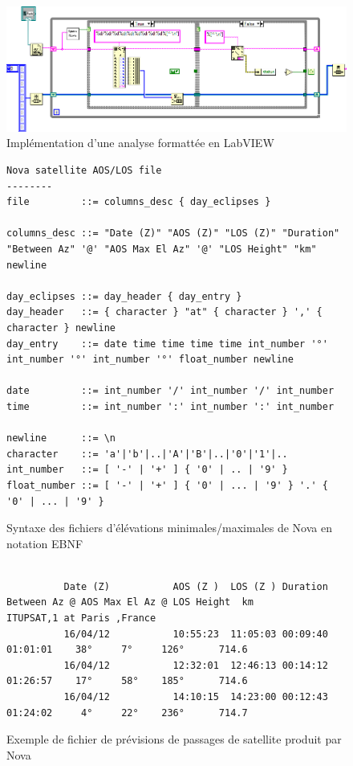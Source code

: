 \documentclass[twocolumn,pre,floats,aps,amsmath,amssymb]{revtex4}
\begin{document}
\begin{figure}[]
  \includegraphics[width=17cm]{pictures/parser_nova_labview.png}
\caption{Impl\'ementation d'une analyse formatt\'ee en LabVIEW}
\label{fig:algo_scan_parse_nova_labview}
\end{figure}

\begin{figure}
\begin{verbatim}
Nova satellite AOS/LOS file
--------
file         ::= columns_desc { day_eclipses }

columns_desc ::= "Date (Z)" "AOS (Z)" "LOS (Z)" "Duration" "Between Az" '@' "AOS Max El Az" '@' "LOS Height" "km" newline

day_eclipses ::= day_header { day_entry }
day_header   ::= { character } "at" { character } ',' { character } newline
day_entry    ::= date time time time time int_number '°' int_number '°' int_number '°' float_number newline

date         ::= int_number '/' int_number '/' int_number
time         ::= int_number ':' int_number ':' int_number

newline      ::= \n
character    ::= 'a'|'b'|..|'A'|'B'|..|'0'|'1'|..
int_number   ::= [ '-' | '+' ] { '0' | .. | '9' }
float_number ::= [ '-' | '+' ] { '0' | ... | '9' } '.' { '0' | ... | '9' }
\end{verbatim}
\caption{Syntaxe des fichiers d'\'el\'evations minimales/maximales de Nova en notation EBNF}
\label{fig:EBNF_Nova}
\end{figure}

\begin{figure}
{\scriptsize
\begin{verbatim}

          Date (Z)           AOS (Z )  LOS (Z ) Duration  Between Az @ AOS Max El Az @ LOS Height  km 
ITUPSAT,1 at Paris ,France                                                                            
          16/04/12           10:55:23  11:05:03 00:09:40 01:01:01    38°     7°     126°      714.6   
          16/04/12           12:32:01  12:46:13 00:14:12 01:26:57    17°     58°    185°      714.6   
          16/04/12           14:10:15  14:23:00 00:12:43 01:24:02     4°     22°    236°      714.7   

\end{verbatim}
}
\caption{Exemple de fichier de pr\'evisions de passages de satellite produit par Nova}
\label{fig:EBNF_Nova2}
\end{figure}
\end{document}
